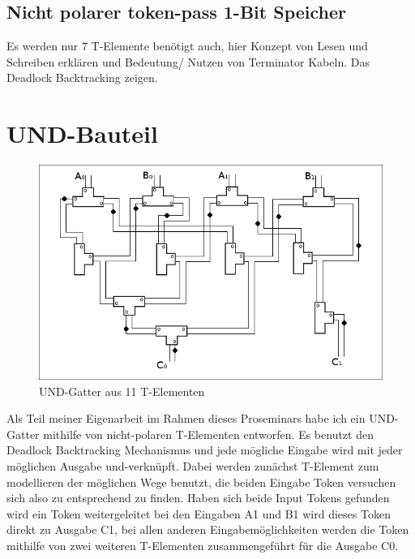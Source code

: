\documentclass[11pt,a4paper]{article}
\begin{document}
\subsection{Nicht polarer token-pass 1-Bit Speicher}
Es werden nur 7 T-Elemente benötigt auch, hier Konzept von Lesen und Schreiben
erklären und Bedeutung/ Nutzen von Terminator Kabeln.
Das Deadlock Backtracking zeigen.



\section{UND-Bauteil}

\begin{figure}[h]
    \centering
    \includegraphics[width=12cm]{bilder/UndGatter.png}
    \caption{UND-Gatter aus 11 T-Elementen}
\end{figure}    

Als Teil meiner Eigenarbeit im Rahmen dieses Proseminars habe ich ein UND-Gatter
mithilfe von nicht-polaren T-Elementen entworfen.
%
Es benutzt den Deadlock Backtracking Mechanismus und jede 
mögliche Eingabe wird mit jeder möglichen Ausgabe und-verknüpft. 
%
Dabei werden zunächst T-Element zum modellieren der möglichen Wege benutzt,
die beiden Eingabe Token versuchen sich also zu entsprechend zu finden.
%
Haben sich beide Input Tokens gefunden wird ein Token weitergeleitet bei 
den Eingaben A1 und B1 wird dieses Token direkt zu Ausgabe C1, bei allen 
anderen Eingabemöglichkeiten werden die Token mithilfe von zwei weiteren 
T-Elementen zusammengeführt für die Ausgabe C0.

\end{document}
